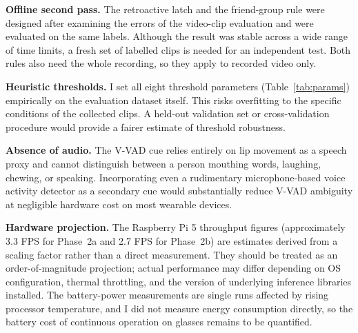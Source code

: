 \textbf{Offline second pass.} The retroactive latch and the friend-group rule were
designed after examining the errors of the video-clip evaluation and were evaluated
on the same labels. Although the result was stable across a wide range of time
limits, a fresh set of labelled clips is needed for an independent test. Both rules
also need the whole recording, so they apply to recorded video only.

\textbf{Heuristic thresholds.} I set all eight threshold parameters
(Table~\ref{tab:params}) empirically on the evaluation dataset itself. This risks
overfitting to the specific conditions of the collected clips. A held-out validation set or
cross-validation procedure would provide a fairer estimate of threshold robustness.

\textbf{Absence of audio.} The V-VAD cue relies entirely on lip movement as a
speech proxy and cannot distinguish between a person mouthing words, laughing,
chewing, or speaking. Incorporating even a rudimentary microphone-based voice
activity detector as a secondary cue would substantially reduce V-VAD ambiguity at
negligible hardware cost on most wearable devices.

\textbf{Hardware projection.} The Raspberry Pi 5 throughput figures (approximately
3.3 FPS for Phase~2a and 2.7 FPS for Phase~2b) are estimates derived from a scaling factor rather than a direct
measurement. They should be treated as an order-of-magnitude projection; actual
performance may differ depending on OS configuration, thermal throttling, and the
version of underlying inference libraries installed. The battery-power measurements
are single runs affected by rising processor temperature, and I did not measure
energy consumption directly, so the battery cost of continuous operation on glasses
remains to be quantified.
